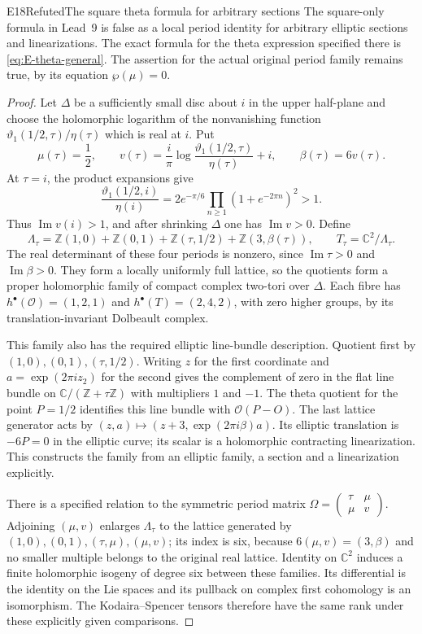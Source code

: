 \begin{statement}{E18}{Refuted}{The square theta formula for arbitrary sections}
The square-only formula in Lead~9 is false as a local period
identity for arbitrary elliptic sections and linearizations.
The exact formula for the theta expression specified there is
\eqref{eq:E-theta-general}. The assertion for the actual original
period family remains true, by its equation $\wp(\mu)=0$.
\end{statement}
\begin{proof}
Let $\Delta$ be a sufficiently small disc about $i$ in the upper
half-plane and choose the holomorphic logarithm of the nonvanishing
function $\vartheta_1(1/2,\tau)/\eta(\tau)$ which is real at $i$.
Put
\[
 \mu(\tau)=\frac12,\qquad
 v(\tau)=\frac{i}{\pi}
       \log\frac{\vartheta_1(1/2,\tau)}{\eta(\tau)}+i,
 \qquad \beta(\tau)=6v(\tau).
\]
At $\tau=i$, the product expansions give
\[
 \frac{\vartheta_1(1/2,i)}{\eta(i)}
 =2e^{-\pi/6}\prod_{n\geq1}(1+e^{-2\pi n})^2>1.
\]
Thus $\operatorname{Im}v(i)>1$, and after shrinking $\Delta$
one has $\operatorname{Im}v>0$. Define
\[
 \Lambda_\tau=\mathbb Z(1,0)+\mathbb Z(0,1)
 +\mathbb Z(\tau,1/2)+\mathbb Z(3,\beta(\tau)),
 \qquad T_\tau=\mathbb C^2/\Lambda_\tau.
\]
The real determinant of these four periods is nonzero, since
$\operatorname{Im}\tau>0$ and $\operatorname{Im}\beta>0$.
They form a locally uniformly full lattice, so the quotients form
a proper holomorphic family of compact complex two-tori over
$\Delta$. Each fibre has
$h^\bullet(\mathcal O)=(1,2,1)$ and
$h^\bullet(T)=(2,4,2)$, with zero higher groups, by its
translation-invariant Dolbeault complex.

This family also has the required elliptic line-bundle
description. Quotient first by $(1,0),(0,1),(\tau,1/2)$.
Writing $z$ for the first coordinate and $a=\exp(2\pi iz_2)$
for the second gives the complement of zero in the flat line
bundle on $\mathbb C/(\mathbb Z+\tau\mathbb Z)$ with multipliers
$1$ and $-1$. The theta quotient for the point $P=1/2$ identifies
this line bundle with $\mathcal O(P-O)$. The last lattice
generator acts by
$(z,a)\mapsto(z+3,\exp(2\pi i\beta)a)$.
Its elliptic translation is $-6P=0$ in the elliptic curve;
its scalar is a holomorphic contracting linearization. This
constructs the family from an elliptic family, a section and a
linearization explicitly.

There is a specified relation to the symmetric period matrix
$\Omega=\left(\begin{smallmatrix}\tau&\mu\\\mu&v\end{smallmatrix}\right)$.
Adjoining $(\mu,v)$ enlarges $\Lambda_\tau$ to the lattice
generated by $(1,0),(0,1),(\tau,\mu),(\mu,v)$; its index is six,
because $6(\mu,v)=(3,\beta)$ and no smaller multiple belongs
to the original real lattice. Identity on $\mathbb C^2$ induces
a finite holomorphic isogeny of degree six between these families.
Its differential is the identity on the Lie spaces and its
pullback on complex first cohomology is an isomorphism. The
Kodaira--Spencer tensors therefore have the same rank under
these explicitly given comparisons.


\end{proof}
